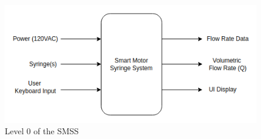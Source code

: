 \documentclass[journal]{IEEEtran}
\begin{document}
            \begin{figure}[H]
                \centering
                \includegraphics[scale=0.47]{Level0_FD}
                \caption{Level 0 of the SMSS}
                \label{fig:level0}
            \end{figure}
            
\end{document}
